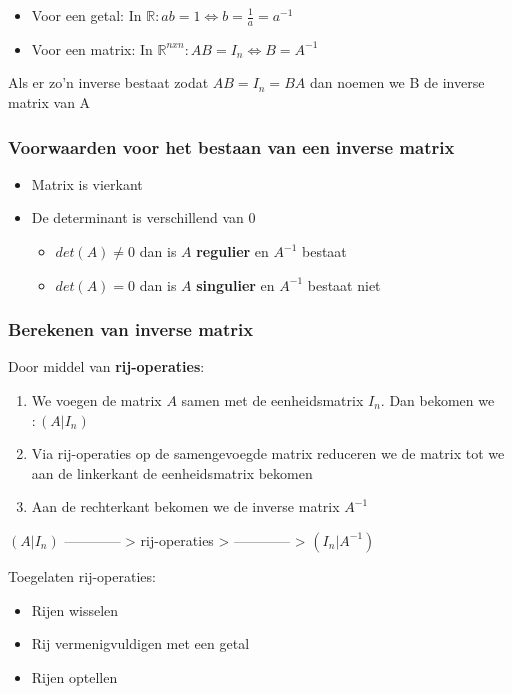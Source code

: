 \documentclass{article}
\begin{document}
\begin{itemize}
    \item Voor een getal: In $\mathbb{R}: ab = 1 \Leftrightarrow b = \frac{1}{a} = a^{-1}$
    \item Voor een matrix: In $\mathbb{R}^{nxn}: AB = I_n \Leftrightarrow B  = A^{-1}$
\end{itemize}

Als er zo'n inverse bestaat zodat $AB = I_n = BA$ dan noemen we B de inverse matrix van A

\subsubsection{Voorwaarden voor het bestaan van een inverse matrix}

\begin{itemize}
    \item Matrix is vierkant
    \item De determinant is verschillend van $0$
    \begin{itemize}
        \item $det(A) \neq 0$ dan is $A$ \textbf{regulier} en $A^{-1}$ bestaat
        \item $det(A) = 0$ dan is $A$ \textbf{singulier} en $A^{-1}$ bestaat niet
    \end{itemize}
\end{itemize}

\subsubsection{Berekenen van inverse matrix}

Door middel van \textbf{rij-operaties}: 

\begin{enumerate}
    \item We voegen de matrix $A$ samen met de eenheidsmatrix $I_n$. Dan bekomen we $: (A | I_n)$
    \item Via rij-operaties op de samengevoegde matrix reduceren we de matrix tot we aan de linkerkant de eenheidsmatrix bekomen
    \item Aan de rechterkant bekomen we de inverse matrix $A^{-1}$
\end{enumerate}

$(A | I_n)$ ------------ > rij-operaties > ------------ > $(I_n | A^{-1})$

Toegelaten rij-operaties:

\begin{itemize}
    \item Rijen wisselen
    \item Rij vermenigvuldigen met een getal
    \item Rijen optellen
\end{itemize}
\end{document}
